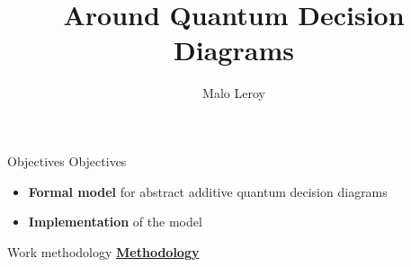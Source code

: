 \documentclass[french, 12pt]{beamer}
\title{Around Quantum Decision Diagrams}
\author{Malo Leroy}
\institute{Research Track -- CentraleSupélec}
\begin{document}
\begin{frame}
    \titlepage
\end{frame}





\begin{frame}{Objectives}
    Objectives
    \begin{itemize}
        \item \textbf{Formal model} for abstract additive quantum decision diagrams
        \item \textbf{Implementation} of the model
    \end{itemize}
\end{frame}

\begin{frame}{Work methodology}
\underline{\textbf{Methodology}}
\small{
\begin{center}
\end{center}
}
\end{frame}
\end{document}
